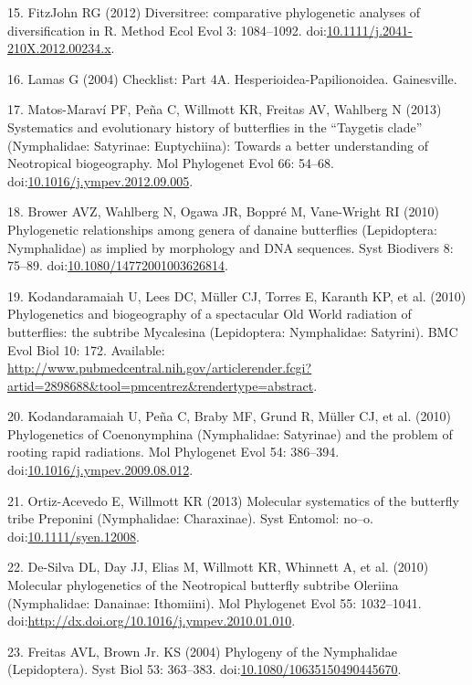 \documentclass[10pt]{article}
\begin{document}
15. FitzJohn RG (2012) Diversitree: comparative phylogenetic analyses of
diversification in R. Method Ecol Evol 3: 1084--1092.
doi:\href{http://dx.doi.org/10.1111/j.2041-210X.2012.00234.x}{10.1111/j.2041-210X.2012.00234.x}.

16. Lamas G (2004) Checklist: Part 4A. Hesperioidea-Papilionoidea.
Gainesville.

17. Matos-Maraví PF, Peña C, Willmott KR, Freitas AV, Wahlberg N (2013)
Systematics and evolutionary history of butterflies in the ``Taygetis
clade'' (Nymphalidae: Satyrinae: Euptychiina): Towards a better
understanding of Neotropical biogeography. Mol Phylogenet Evol 66:
54--68.
doi:\href{http://dx.doi.org/10.1016/j.ympev.2012.09.005}{10.1016/j.ympev.2012.09.005}.

18. Brower AVZ, Wahlberg N, Ogawa JR, Boppré M, Vane-Wright RI (2010)
Phylogenetic relationships among genera of danaine butterflies
(Lepidoptera: Nymphalidae) as implied by morphology and DNA sequences.
Syst Biodivers 8: 75--89.
doi:\href{http://dx.doi.org/10.1080/14772001003626814}{10.1080/14772001003626814}.

19. Kodandaramaiah U, Lees DC, Müller CJ, Torres E, Karanth KP, et al.
(2010) Phylogenetics and biogeography of a spectacular Old World
radiation of butterflies: the subtribe Mycalesina (Lepidoptera:
Nymphalidae: Satyrini). BMC Evol Biol 10: 172. Available:
\url{http://www.pubmedcentral.nih.gov/articlerender.fcgi?artid=2898688\&tool=pmcentrez\&rendertype=abstract}.

20. Kodandaramaiah U, Peña C, Braby MF, Grund R, Müller CJ, et al.
(2010) Phylogenetics of Coenonymphina (Nymphalidae: Satyrinae) and the
problem of rooting rapid radiations. Mol Phylogenet Evol 54: 386--394.
doi:\href{http://dx.doi.org/10.1016/j.ympev.2009.08.012}{10.1016/j.ympev.2009.08.012}.

21. Ortiz-Acevedo E, Willmott KR (2013) Molecular systematics of the
butterfly tribe Preponini (Nymphalidae: Charaxinae). Syst Entomol:
no--o.
doi:\href{http://dx.doi.org/10.1111/syen.12008}{10.1111/syen.12008}.

22. De-Silva DL, Day JJ, Elias M, Willmott KR, Whinnett A, et al. (2010)
Molecular phylogenetics of the Neotropical butterfly subtribe Oleriina
(Nymphalidae: Danainae: Ithomiini). Mol Phylogenet Evol 55: 1032--1041.
doi:\href{http://dx.doi.org/http://dx.doi.org/10.1016/j.ympev.2010.01.010}{http://dx.doi.org/10.1016/j.ympev.2010.01.010}.

23. Freitas AVL, Brown Jr. KS (2004) Phylogeny of the Nymphalidae
(Lepidoptera). Syst Biol 53: 363--383.
doi:\href{http://dx.doi.org/10.1080/10635150490445670}{10.1080/10635150490445670}.
\end{document}

